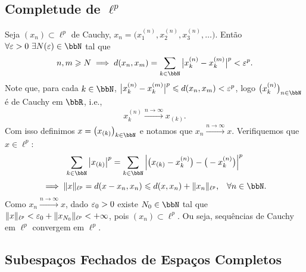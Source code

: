 



\subsection{Completude de $\ell^p$}

\begin{myproof}
	Seja $(x_n)\subset\ell^p$ de Cauchy, $x_n=\big(x_1^{(n)},x_2^{(n)},x_3^{(n)},\dots\big)$. Então
	$\forall\eps>0\ \exists N(\eps)\in\bbN$ tal que
	$$n,m\geq N \implies d(x_n,x_m)=\sum_{k\in\bbN}\big|x_k^{(n)}-x_k^{(m)}\big|^p<\eps^p\text{.}$$
	Note que, para cada $k\in\bbN$, $\big|x_k^{(n)}-x_k^{(m)}\big|^p\leqslant d(x_n,x_m)<\varepsilon^p$, logo
	$\big(x_k^{(n)}\big)_{n\in\bbN}$ é de Cauchy em $\bbR$, i.e.,
	\begin{align}
		x_k^{(n)}\xrightarrow{n\to\infty}x_{(k)}\text{.}
	\end{align}
	Com isso definimos $x=\big(x_{(k)}\big)_{k\in\bbN}$ e notamos que $x_n\xrightarrow{n\to\infty}x$.
	Verifiquemos que $x\in\ell^p$:
	$$\sum_{k\in\bbN}\big|x_{(k)}\big|^p=\sum_{k\in\bbN}\Big|\big(x_{(k)}-x_k^{(n)}\big)-\big(-x_k^{(n)}\big)\Big|^p$$
	$$\implies \|x\|_{\ell^p}=d(x-x_n,x_n)\leq d(x,x_n)+\|x_n\|_{\ell^p}\text{,}\quad \forall n\in\bbN\text{.}$$
	Como $x_n\xrightarrow{n\to\infty}x$, dado $\varepsilon_0>0$ existe $N_0\in\bbN$ tal que
	$\|x\|_{\ell^p}<\varepsilon_0+\|x_{N_0}\|_{\ell^p}<+\infty$, pois $(x_n)\subset\ell^p$. Ou seja, sequências de
	Cauchy em $\ell^p$ convergem em $\ell^p$.
\end{myproof}

\subsection{Subespaços Fechados de Espaços Completos}

